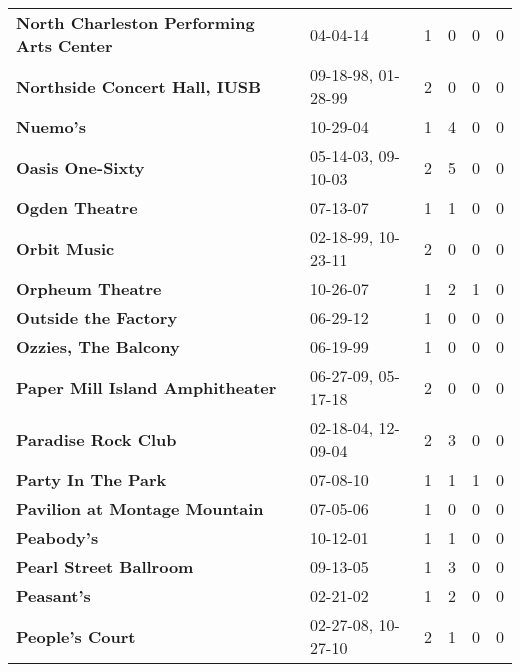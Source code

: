 \begin{supertabular}{p{0.4\textwidth}p{0.3\textwidth}p{0.05\textwidth}p{0.05\textwidth}p{0.05\textwidth}p{0.05\textwidth}}
                     \textbf{North Charleston Performing Arts Center} &            04-04-14 &  1 &  0 &  0 &  0 \\
                                \textbf{Northside Concert Hall, IUSB} &  09-18-98, 01-28-99 &  2 &  0 &  0 &  0 \\
                                                     \textbf{Nuemo's} &            10-29-04 &  1 &  4 &  0 &  0 \\
                                             \textbf{Oasis One-Sixty} &  05-14-03, 09-10-03 &  2 &  5 &  0 &  0 \\
                                               \textbf{Ogden Theatre} &            07-13-07 &  1 &  1 &  0 &  0 \\
                                                 \textbf{Orbit Music} &  02-18-99, 10-23-11 &  2 &  0 &  0 &  0 \\
                                             \textbf{Orpheum Theatre} &            10-26-07 &  1 &  2 &  1 &  0 \\
                                         \textbf{Outside the Factory} &            06-29-12 &  1 &  0 &  0 &  0 \\
                                         \textbf{Ozzies, The Balcony} &            06-19-99 &  1 &  0 &  0 &  0 \\
                              \textbf{Paper Mill Island Amphitheater} &  06-27-09, 05-17-18 &  2 &  0 &  0 &  0 \\
                                          \textbf{Paradise Rock Club} &  02-18-04, 12-09-04 &  2 &  3 &  0 &  0 \\
                                           \textbf{Party In The Park} &            07-08-10 &  1 &  1 &  1 &  0 \\
                                \textbf{Pavilion at Montage Mountain} &            07-05-06 &  1 &  0 &  0 &  0 \\
                                                   \textbf{Peabody's} &            10-12-01 &  1 &  1 &  0 &  0 \\
                                       \textbf{Pearl Street Ballroom} &            09-13-05 &  1 &  3 &  0 &  0 \\
                                                   \textbf{Peasant's} &            02-21-02 &  1 &  2 &  0 &  0 \\
                                              \textbf{People's Court} &  02-27-08, 10-27-10 &  2 &  1 &  0 &  0 \\

\end{supertabular}
